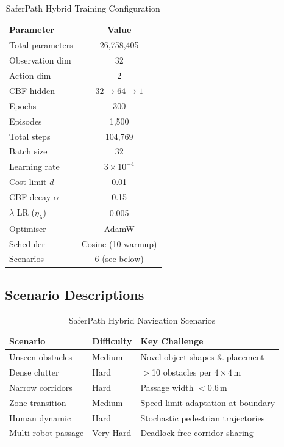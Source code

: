 \documentclass[conference]{IEEEtran}
\begin{document}
\begin{table}[h]
\centering
\caption{SaferPath Hybrid Training Configuration}
\begin{tabular}{@{}lc@{}}
\toprule
\textbf{Parameter} & \textbf{Value} \\
\midrule
Total parameters & 26,758,405 \\
Observation dim & 32 \\
Action dim & 2 \\
CBF hidden & $32 \to 64 \to 1$ \\
Epochs & 300 \\
Episodes & 1,500 \\
Total steps & 104,769 \\
Batch size & 32 \\
Learning rate & $3 \times 10^{-4}$ \\
Cost limit $d$ & 0.01 \\
CBF decay $\alpha$ & 0.15 \\
$\lambda$ LR ($\eta_\lambda$) & 0.005 \\
Optimiser & AdamW \\
Scheduler & Cosine (10 warmup) \\
Scenarios & 6 (see below) \\
\bottomrule
\end{tabular}
\end{table}

\subsection{Scenario Descriptions}

\begin{table}[h]
\centering
\caption{SaferPath Hybrid Navigation Scenarios}
\begin{tabular}{@{}lll@{}}
\toprule
\textbf{Scenario} & \textbf{Difficulty} & \textbf{Key Challenge} \\
\midrule
Unseen obstacles      & Medium & Novel object shapes \& placement \\
Dense clutter         & Hard   & $>$10 obstacles per $4\times4$\,m \\
Narrow corridors      & Hard   & Passage width $<$0.6\,m \\
Zone transition       & Medium & Speed limit adaptation at boundary \\
Human dynamic         & Hard   & Stochastic pedestrian trajectories \\
Multi-robot passage   & Very Hard & Deadlock-free corridor sharing \\
\bottomrule
\end{tabular}
\end{table}
\end{document}

